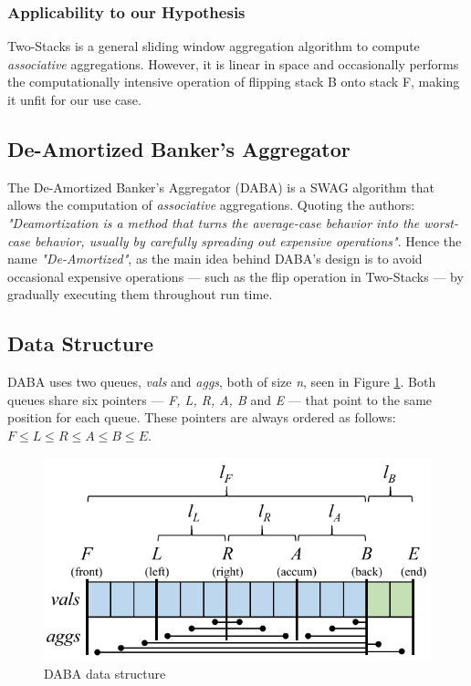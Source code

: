 \subsubsection*{Applicability to our Hypothesis}
Two-Stacks is a general sliding window aggregation algorithm to compute \textit{associative} aggregations. However, it is linear in space and occasionally performs the computationally intensive operation of flipping stack B onto stack F, making it unfit for our use case.


\subsection{De-Amortized Banker’s Aggregator} \label{sec:daba}

The De-Amortized Banker’s Aggregator (DABA) \cite{Tangwongsan-DABA} is a SWAG algorithm that allows the computation of \textit{associative} aggregations. Quoting the authors: \textit{"Deamortization is a method that turns the average-case behavior into the worst-case behavior, usually by carefully spreading out expensive operations"}. Hence the name \textit{"De-Amortized"}, as the main idea behind DABA's design is to avoid occasional expensive operations --- such as the flip operation in Two-Stacks --- by gradually executing them throughout run time.

\subsection*{Data Structure}

DABA uses two queues, \textit{vals} and \textit{aggs}, both of size \textit{n}, seen in Figure \ref{fig:daba-ds}. Both queues share six pointers --- \textit{F, L, R, A, B} and \textit{E} --- that point to the same position for each queue. These pointers are always ordered as follows: $\textit{F} \leq \textit{L} \leq \textit{R} \leq \textit{A} \leq \textit{B} \leq \textit{E}.$

\begin{figure}[!htb]
    \begin{center}
      \includegraphics[scale=0.6]{figures/daba-ds.png}
      \caption{DABA data structure}
      \label{fig:daba-ds}
    \end{center}
\end{figure}

